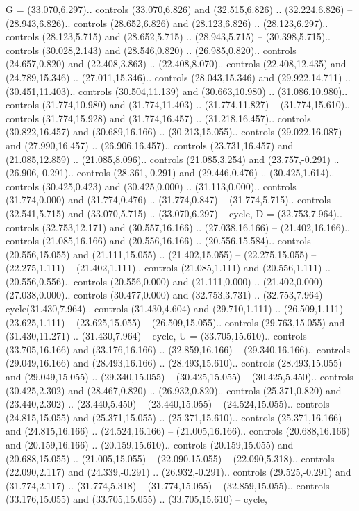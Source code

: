 {G} = {(33.070,6.297).. controls (33.070,6.826) and (32.515,6.826) .. (32.224,6.826) -- (28.943,6.826).. controls (28.652,6.826) and (28.123,6.826) .. (28.123,6.297).. controls (28.123,5.715) and (28.652,5.715) .. (28.943,5.715) -- (30.398,5.715).. controls (30.028,2.143) and (28.546,0.820) .. (26.985,0.820).. controls (24.657,0.820) and (22.408,3.863) .. (22.408,8.070).. controls (22.408,12.435) and (24.789,15.346) .. (27.011,15.346).. controls (28.043,15.346) and (29.922,14.711) .. (30.451,11.403).. controls (30.504,11.139) and (30.663,10.980) .. (31.086,10.980).. controls (31.774,10.980) and (31.774,11.403) .. (31.774,11.827) -- (31.774,15.610).. controls (31.774,15.928) and (31.774,16.457) .. (31.218,16.457).. controls (30.822,16.457) and (30.689,16.166) .. (30.213,15.055).. controls (29.022,16.087) and (27.990,16.457) .. (26.906,16.457).. controls (23.731,16.457) and (21.085,12.859) .. (21.085,8.096).. controls (21.085,3.254) and (23.757,-0.291) .. (26.906,-0.291).. controls (28.361,-0.291) and (29.446,0.476) .. (30.425,1.614).. controls (30.425,0.423) and (30.425,0.000) .. (31.113,0.000).. controls (31.774,0.000) and (31.774,0.476) .. (31.774,0.847) -- (31.774,5.715).. controls (32.541,5.715) and (33.070,5.715) .. (33.070,6.297) -- cycle},
{D} = {(32.753,7.964).. controls (32.753,12.171) and (30.557,16.166) .. (27.038,16.166) -- (21.402,16.166).. controls (21.085,16.166) and (20.556,16.166) .. (20.556,15.584).. controls (20.556,15.055) and (21.111,15.055) .. (21.402,15.055) -- (22.275,15.055) -- (22.275,1.111) -- (21.402,1.111).. controls (21.085,1.111) and (20.556,1.111) .. (20.556,0.556).. controls (20.556,0.000) and (21.111,0.000) .. (21.402,0.000) -- (27.038,0.000).. controls (30.477,0.000) and (32.753,3.731) .. (32.753,7.964) -- cycle(31.430,7.964).. controls (31.430,4.604) and (29.710,1.111) .. (26.509,1.111) -- (23.625,1.111) -- (23.625,15.055) -- (26.509,15.055).. controls (29.763,15.055) and (31.430,11.271) .. (31.430,7.964) -- cycle},
{U} = {(33.705,15.610).. controls (33.705,16.166) and (33.176,16.166) .. (32.859,16.166) -- (29.340,16.166).. controls (29.049,16.166) and (28.493,16.166) .. (28.493,15.610).. controls (28.493,15.055) and (29.049,15.055) .. (29.340,15.055) -- (30.425,15.055) -- (30.425,5.450).. controls (30.425,2.302) and (28.467,0.820) .. (26.932,0.820).. controls (25.371,0.820) and (23.440,2.302) .. (23.440,5.450) -- (23.440,15.055) -- (24.524,15.055).. controls (24.815,15.055) and (25.371,15.055) .. (25.371,15.610).. controls (25.371,16.166) and (24.815,16.166) .. (24.524,16.166) -- (21.005,16.166).. controls (20.688,16.166) and (20.159,16.166) .. (20.159,15.610).. controls (20.159,15.055) and (20.688,15.055) .. (21.005,15.055) -- (22.090,15.055) -- (22.090,5.318).. controls (22.090,2.117) and (24.339,-0.291) .. (26.932,-0.291).. controls (29.525,-0.291) and (31.774,2.117) .. (31.774,5.318) -- (31.774,15.055) -- (32.859,15.055).. controls (33.176,15.055) and (33.705,15.055) .. (33.705,15.610) -- cycle},
